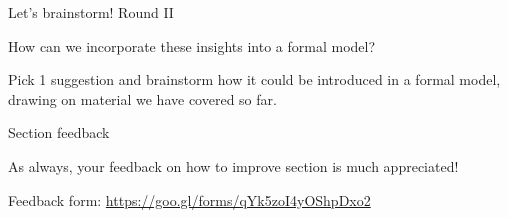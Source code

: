 \documentclass[aspectratio=169]{beamer}
\begin{document}
\begin{frame}{Let's brainstorm! Round II}

\Large
How can we incorporate these insights into a formal model?

\vspace{3em}


\begin{tcolorbox}
Pick \alert{1 suggestion} and brainstorm how it could be introduced in a formal model, drawing on material we have covered so far.
\end{tcolorbox}


\end{frame}
\begin{frame}{Section feedback}

\Large

As always, your feedback on how to improve section is much appreciated!

\vspace{2em}

Feedback form: \url{https://goo.gl/forms/qYk5zoI4yOShpDxo2}


\end{frame}
\end{document}
